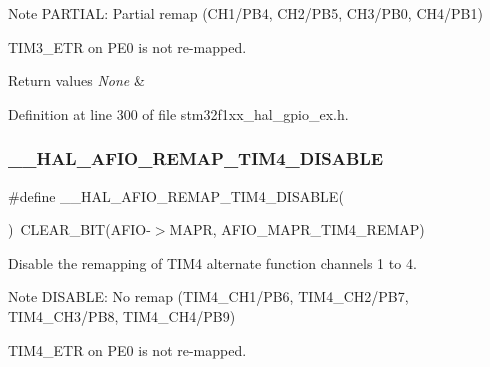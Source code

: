 \begin{DoxyNote}{Note}
P\+A\+R\+T\+I\+AL\+: Partial remap (C\+H1/\+P\+B4, C\+H2/\+P\+B5, C\+H3/\+P\+B0, C\+H4/\+P\+B1) 

T\+I\+M3\+\_\+\+E\+TR on P\+E0 is not re-\/mapped. 
\end{DoxyNote}

\begin{DoxyRetVals}{Return values}
{\em None} & \\
\hline
\end{DoxyRetVals}


Definition at line 300 of file stm32f1xx\+\_\+hal\+\_\+gpio\+\_\+ex.\+h.

\mbox{\label{group___g_p_i_o_ex___a_f_i_o___a_f___r_e_m_a_p_p_i_n_g_gae59894a1c15940479146c77596176dbe}} 
\subsubsection{\texorpdfstring{\+\_\+\+\_\+\+H\+A\+L\+\_\+\+A\+F\+I\+O\+\_\+\+R\+E\+M\+A\+P\+\_\+\+T\+I\+M4\+\_\+\+D\+I\+S\+A\+B\+LE}{\_\_HAL\_AFIO\_REMAP\_TIM4\_DISABLE}}
{\footnotesize\ttfamily \#define \+\_\+\+\_\+\+H\+A\+L\+\_\+\+A\+F\+I\+O\+\_\+\+R\+E\+M\+A\+P\+\_\+\+T\+I\+M4\+\_\+\+D\+I\+S\+A\+B\+LE(\begin{DoxyParamCaption}{ }\end{DoxyParamCaption})~C\+L\+E\+A\+R\+\_\+\+B\+IT(A\+F\+IO-\/$>$M\+A\+PR, A\+F\+I\+O\+\_\+\+M\+A\+P\+R\+\_\+\+T\+I\+M4\+\_\+\+R\+E\+M\+AP)}



Disable the remapping of T\+I\+M4 alternate function channels 1 to 4. 

\begin{DoxyNote}{Note}
D\+I\+S\+A\+B\+LE\+: No remap (T\+I\+M4\+\_\+\+C\+H1/\+P\+B6, T\+I\+M4\+\_\+\+C\+H2/\+P\+B7, T\+I\+M4\+\_\+\+C\+H3/\+P\+B8, T\+I\+M4\+\_\+\+C\+H4/\+P\+B9) 

T\+I\+M4\+\_\+\+E\+TR on P\+E0 is not re-\/mapped. 
\end{DoxyNote}

